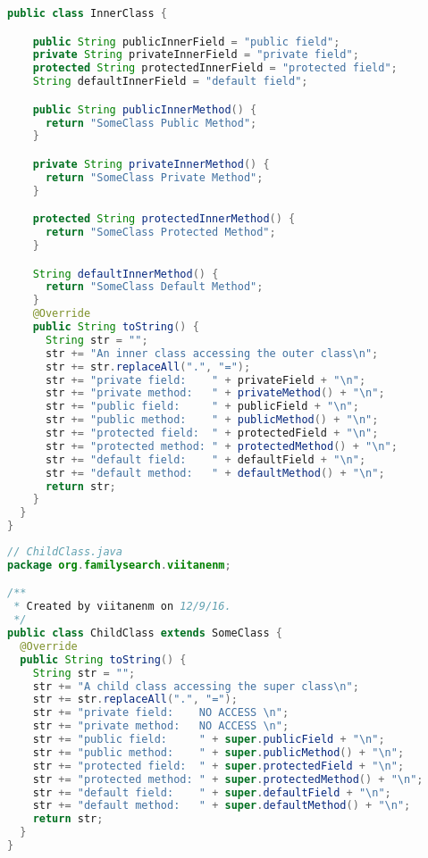 \begin{lstlisting}[language=Java]
  public class InnerClass {

    public String publicInnerField = "public field";
    private String privateInnerField = "private field";
    protected String protectedInnerField = "protected field";
    String defaultInnerField = "default field";

    public String publicInnerMethod() {
      return "SomeClass Public Method";
    }

    private String privateInnerMethod() {
      return "SomeClass Private Method";
    }

    protected String protectedInnerMethod() {
      return "SomeClass Protected Method";
    }

    String defaultInnerMethod() {
      return "SomeClass Default Method";
    }
    @Override
    public String toString() {
      String str = "";
      str += "An inner class accessing the outer class\n";
      str += str.replaceAll(".", "=");
      str += "private field:    " + privateField + "\n";
      str += "private method:   " + privateMethod() + "\n";
      str += "public field:     " + publicField + "\n";
      str += "public method:    " + publicMethod() + "\n";
      str += "protected field:  " + protectedField + "\n";
      str += "protected method: " + protectedMethod() + "\n";
      str += "default field:    " + defaultField + "\n";
      str += "default method:   " + defaultMethod() + "\n";
      return str;
    }
  }
}
\end{lstlisting}

\begin{lstlisting}[language=Java]
// ChildClass.java
package org.familysearch.viitanenm;

/**
 * Created by viitanenm on 12/9/16.
 */
public class ChildClass extends SomeClass {
  @Override
  public String toString() {
    String str = "";
    str += "A child class accessing the super class\n";
    str += str.replaceAll(".", "=");
    str += "private field:    NO ACCESS \n";
    str += "private method:   NO ACCESS \n";
    str += "public field:     " + super.publicField + "\n";
    str += "public method:    " + super.publicMethod() + "\n";
    str += "protected field:  " + super.protectedField + "\n";
    str += "protected method: " + super.protectedMethod() + "\n";
    str += "default field:    " + super.defaultField + "\n";
    str += "default method:   " + super.defaultMethod() + "\n";
    return str;
  }
}
\end{lstlisting}


